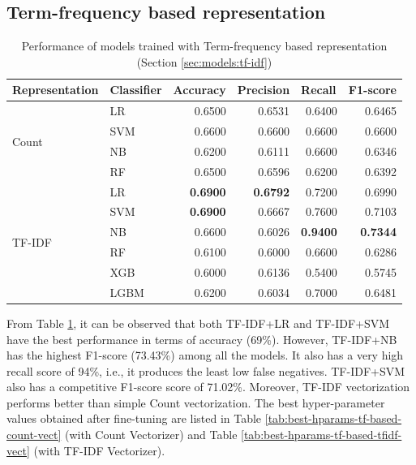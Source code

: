 \subsection{Term-frequency based representation}
\label{sec:results:tf-idf}

\begin{table}[htpb]
\centering
\begin{tabular}{llrrrr}
\hline
\textbf{Representation} & \textbf{Classifier} & \multicolumn{1}{l}{\textbf{Accuracy}} & \multicolumn{1}{l}{\textbf{Precision}} & \multicolumn{1}{l}{\textbf{Recall}} & \multicolumn{1}{l}{\textbf{F1-score}} \\ \hline
\multirow{4}{*}{Count} & LR & 0.6500 & 0.6531 & 0.6400 & 0.6465 \\ 
 & SVM & 0.6600 & 0.6600 & 0.6600 & 0.6600 \\ 
 & NB & 0.6200 & 0.6111 & 0.6600 & 0.6346 \\ 
 & RF & 0.6500 & 0.6596 & 0.6200 & 0.6392 \\ \hline
\multirow{6}{*}{TF-IDF} & LR & \textbf{0.6900} & \textbf{0.6792} & 0.7200 & 0.6990 \\ 
 & SVM & \textbf{0.6900} & 0.6667 & 0.7600 & 0.7103 \\ 
 & NB & 0.6600 & 0.6026 & \textbf{0.9400} & \textbf{0.7344} \\ 
 & RF & 0.6100 & 0.6000 & 0.6600 & 0.6286 \\ 
 & XGB & 0.6000 & 0.6136 & 0.5400 & 0.5745 \\ 
 & LGBM & 0.6200 & 0.6034 & 0.7000 & 0.6481 \\ \hline
\end{tabular}
\caption{Performance of models trained with Term-frequency based representation (Section \ref{sec:models:tf-idf})}
\label{tab:results:performance-tf-based}
\end{table}

From Table \ref{tab:results:performance-tf-based}, it can be observed that both \ac{TF-IDF}+\ac{LR} and \ac{TF-IDF}+\ac{SVM} have the best performance in terms of accuracy (69\%). However, \ac{TF-IDF}+\ac{NB} has the highest F1-score (73.43\%) among all the models. It also has a very high recall score of 94\%, i.e., it produces the least low false negatives. \ac{TF-IDF}+\ac{SVM} also has a competitive F1-score score of 71.02\%. Moreover, \ac{TF-IDF} vectorization performs better than simple Count vectorization. The best hyper-parameter values obtained after fine-tuning are listed in Table \ref{tab:best-hparams-tf-based-count-vect} (with Count Vectorizer) and Table \ref{tab:best-hparams-tf-based-tfidf-vect} (with \ac{TF-IDF} Vectorizer).



